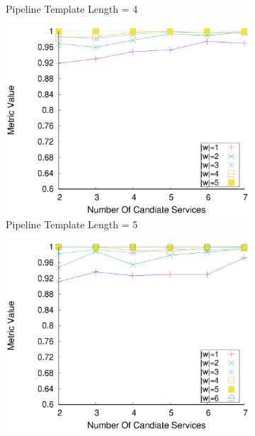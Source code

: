 \begin{figure}[ht!]
\begin{subfigure}{0.49\textwidth}
        \caption{Pipeline Template Length = 4}
        \label{fig:quality_window_wide_qualitative_n4}
      \end{subfigure}
      \hfill
      \begin{subfigure}{0.49\textwidth}
        \includegraphics[width=\textwidth]{Images/graphs/window_quality_performance_diff_qual_n7_s7_20_100_n5}
        \caption{Pipeline Template Length = 5}
        \label{fig:quality_window_wide_qualitative_n5}
      \end{subfigure}
      \hfill
      \begin{subfigure}{0.49\textwidth}
        \includegraphics[width=\textwidth]{Images/graphs/window_quality_performance_diff_qual_n7_s7_20_100_n6}

\end{subfigure}
\end{figure}
